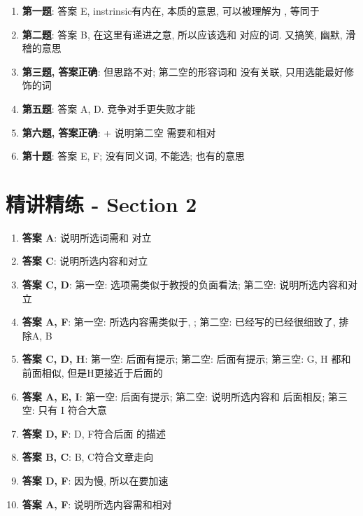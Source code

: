     \begin{enumerate}
      \item \textbf{第一题}: 答案 E, instrinsic有内在, 本质的意思, 可以被理解为
      , 等同于
      \item \textbf{第二题}: 答案 B,  在这里有递进之意, 所以应该选和
      对应的词. 又搞笑, 幽默, 滑稽的意思
      \item \textbf{第三题, 答案正确}: 但思路不对; 第二空的形容词和
      没有关联, 只用选能最好修饰的词
      \item \textbf{第五题}: 答案 A, D. 竞争对手更失败才能
      \item \textbf{第六题, 答案正确}:  + 说明第二空
      需要和相对
      \item \textbf{第十题}: 答案 E, F; 没有同义词, 不能选;
      也有的意思
    \end{enumerate}

\section{精讲精练 - Section 2}

  \begin{enumerate}
    \item \textbf{答案 A}: 说明所选词需和
    对立
    \item \textbf{答案 C}: 说明所选内容和对立
    \item \textbf{答案 C, D}: 第一空: 选项需类似于教授的负面看法;
    第二空: 说明所选内容和对立
    \item \textbf{答案 A, F}: 第一空: 所选内容需类似于,
    ; 第二空: 已经写的已经很细致了, 排除A, B
    \item \textbf{答案 C, D, H}: 第一空: 后面有提示; 第二空: 后面有提示; 第三空:
    G, H 都和前面相似, 但是H更接近于后面的
    \item \textbf{答案 A, E, I}: 第一空: 后面有提示; 第二空: 说明所选内容和
    后面相反; 第三空: 只有 I 符合大意
    \item \textbf{答案 D, F}: D, F符合后面
    的描述
    \item \textbf{答案 B, C}: B, C符合文章走向
    \item \textbf{答案 D, F}: 因为慢, 所以在要加速
    \item \textbf{答案 A, F}: 说明所选内容需和相对
  \end{enumerate}

